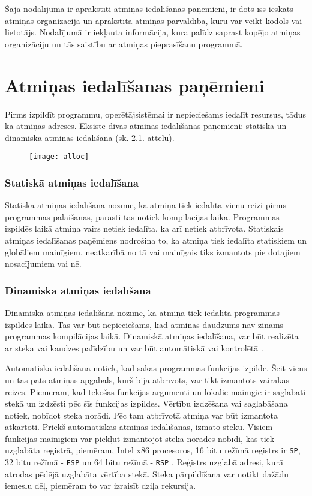 ﻿Šajā nodalījumā ir aprakstīti atmiņas iedalīšanas paņēmieni, ir dots īss ieskāts atmiņas organizācijā un aprakstīta atmiņas pārvaldība, kuru var veikt kodols vai lietotājs.
Nodalījumā ir iekļauta informācija, kura palīdz saprast kopējo atmiņas organizāciju un tās saistību ar atmiņas pieprasīšanu programmā. 
\section{Atmiņas iedalīšanas paņēmieni}

Pirms izpildīt programmu, operētājsistēmai ir nepieciešams iedalīt resursus, tādus kā atmiņas adreses.  
Eksistē divas atmiņas iedalīšanas paņēmieni: statiskā un dinamiskā atmiņas iedalīšana (sk. 2.1. attēlu). 

\begin{figure}[h]
\begin{center}
\texttt{[image: alloc]}
\end{center}
\caption{\textbf{\fontsize{11}{12}\selectfont {Atmiņas iedalīšanas paņēmienu klasifikācija}}}
\label{fig:alloc}
\end{figure}


\subsubsection{Statiskā atmiņas iedalīšana}
Statiskā atmiņas iedalīšana nozīme, ka atmiņa tiek iedalīta vienu reizi pirms programmas palaišanas, parasti tas notiek kompilācijas laikā.
Programmas izpildēs laikā atmiņa vairs netiek iedalīta, ka arī netiek atbrīvota. 
Statiskais atmiņas iedalīšanas paņēmiens nodrošina to, ka atmiņa tiek iedalīta statiskiem un globāliem mainīgiem, neatkarībā no tā vai mainīgais tiks izmantots pie dotajiem nosacījumiem vai nē.

\subsubsection{Dinamiskā atmiņas iedalīšana}
Dinamiskā atmiņas iedalīšana nozīme, ka atmiņa tiek iedalīta programmas izpildes laikā.
Tas var būt nepieciešams, kad atmiņas daudzums nav zināms programmas kompilācijas laikā. 
Dinamiskā atmiņas iedalīšana, var būt realizēta ar steka vai kaudzes palīdzību un var būt automātiskā vai kontrolētā \cite{SDMA}.

Automātiskā iedalīšana notiek, kad sākās programmas funkcijas izpilde. 
Šeit viens un tas pats atmiņas apgabals, kurš bija atbrīvots, var tikt izmantots  vairākas reizēs. 
Piemēram, kad tekošās funkcijas argumenti un lokālie mainīgie ir saglabāti stekā un izdzēsti pēc šīs funkcijas izpildes. 
Vērtību izdzēšana vai saglabāšana notiek, nobīdot steka norādi.
Pēc tam atbrīvotā atmiņa var būt izmantota atkārtoti. 
Priekš automātiskās atmiņas iedalīšanas, izmato steku.
Visiem funkcijas mainīgiem var piekļūt izmantojot steka norādes nobīdi, kas tiek uzglabāta reģistrā, piemēram,  
Intel x86 procesoros, 16 bitu režīmā reģistrs ir \texttt{SP}, 32 bitu režīmā - \texttt{ESP} un 64 bitu režīmā - \texttt{RSP} \cite{JCL}.
Reģistrs uzglabā adresi, kurā atrodas pēdējā uzglabāta vērtība stekā.
Steka pārpildīšana var notikt dažādu iemeslu dēļ, piemēram to var izraisīt dziļa rekursija.
 
